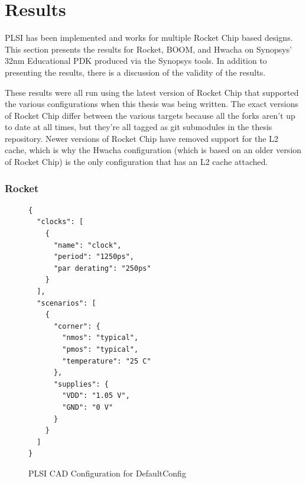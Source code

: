 \documentclass{article}
\begin{document}
\chapter{Results}

PLSI has been implemented and works for multiple Rocket Chip based designs.
This section presents the results for Rocket, BOOM, and Hwacha on Synopsys'
32nm Educational PDK produced via the Synopsys tools.  In addition to
presenting the results, there is a discussion of the validity of the results.

These results were all run using the latest version of Rocket Chip that
supported the various configurations when this thesis was being written.  The
exact versions of Rocket Chip differ between the various targets because all
the forks aren't up to date at all times, but they're all tagged as git
submodules in the thesis repository.  Newer versions of Rocket Chip have
removed support for the L2 cache, which is why the Hwacha configuration (which
is based on an older version of Rocket Chip) is the only configuration that has
an L2 cache attached.

\subsection{Rocket}

\begin{figure}
  \begin{verbatim}
{
  "clocks": [
    {
      "name": "clock",
      "period": "1250ps",
      "par derating": "250ps"
    }
  ],
  "scenarios": [
    {
      "corner": {
        "nmos": "typical",
        "pmos": "typical",
        "temperature": "25 C"
      },
      "supplies": {
        "VDD": "1.05 V",
        "GND": "0 V"
      }
    }
  ]
}
\end{verbatim}
  \caption{PLSI CAD Configuration for DefaultConfig}
  \label{res:rocket-config}
\end{figure}
\end{document}
